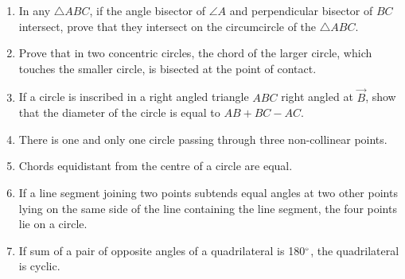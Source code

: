 \begin{enumerate}[label=\thesubsection.\arabic*,ref=\thesubsection.\theenumi]
\item In any $\triangle ABC$, if the angle bisector of $\angle A$ and perpendicular bisector of $BC$ intersect, prove that they intersect on the circumcircle of the $\triangle ABC$.
%
%
\item Prove that in two concentric circles, the chord of the larger circle, which touches the smaller circle, is bisected at the point of contact.
%
%
%
     	\item If a circle is inscribed in a right angled triangle $ABC$ right angled at $\vec{B}$, show that the diameter of the circle is equal to $AB+BC-AC$.
\item  There is one and only one circle passing through three non-collinear points. 
\item Chords equidistant from the centre  of a circle  are equal.
\item  If a line segment joining two points subtends equal angles at two other points lying on the same side of the line containing the line segment, the four points lie on a circle. 
	\iffalse
\begin{enumerate}


\end{enumerate}
\fi
\item  If sum of a pair of opposite angles of a quadrilateral is 180$\degree$, the quadrilateral is cyclic.
\end{enumerate}
